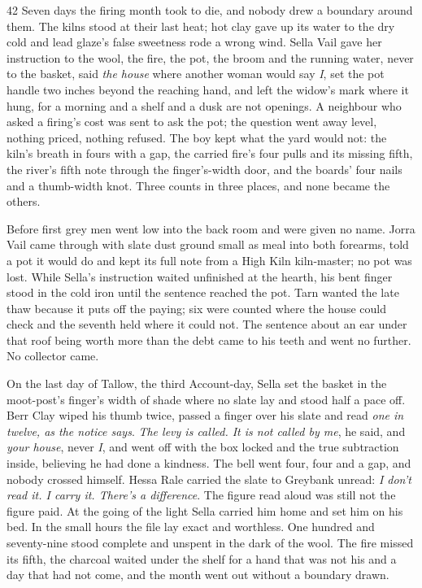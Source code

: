 \begin{CRchronicle}{42}
Seven days the firing month took to die, and nobody drew a boundary around them. The kilns stood at their last heat; hot clay gave up its water to the dry cold and lead glaze’s false sweetness rode a wrong wind. Sella Vail gave her instruction to the wool, the fire, the pot, the broom and the running water, never to the basket, said \emph{the house} where another woman would say \emph{I}, set the pot handle two inches beyond the reaching hand, and left the widow’s mark where it hung, for a morning and a shelf and a dusk are not openings. A neighbour who asked a firing’s cost was sent to ask the pot; the question went away level, nothing priced, nothing refused. The boy kept what the yard would not: the kiln’s breath in fours with a gap, the carried fire’s four pulls and its missing fifth, the river’s fifth note through the finger’s-width door, and the boards’ four nails and a thumb-width knot. Three counts in three places, and none became the others.

Before first grey men went low into the back room and were given no name. Jorra Vail came through with slate dust ground small as meal into both forearms, told a pot it would do and kept its full note from a High Kiln kiln-master; no pot was lost. While Sella’s instruction waited unfinished at the hearth, his bent finger stood in the cold iron until the sentence reached the pot. Tarn wanted the late thaw because it puts off the paying; six were counted where the house could check and the seventh held where it could not. The sentence about an ear under that roof being worth more than the debt came to his teeth and went no further. No collector came.

On the last day of Tallow, the third Account-day, Sella set the basket in the moot-post’s finger’s width of shade where no slate lay and stood half a pace off. Berr Clay wiped his thumb twice, passed a finger over his slate and read \emph{one in twelve, as the notice says}. \emph{The levy is called. It is not called by me}, he said, and \emph{your house}, never \emph{I}, and went off with the box locked and the true subtraction inside, believing he had done a kindness. The bell went four, four and a gap, and nobody crossed himself. Hessa Rale carried the slate to Greybank unread: \emph{I don’t read it. I carry it. There’s a difference}. The figure read aloud was still not the figure paid. At the going of the light Sella carried him home and set him on his bed. In the small hours the file lay exact and worthless. One hundred and seventy-nine stood complete and unspent in the dark of the wool. The fire missed its fifth, the charcoal waited under the shelf for a hand that was not his and a day that had not come, and the month went out without a boundary drawn.
\end{CRchronicle}
